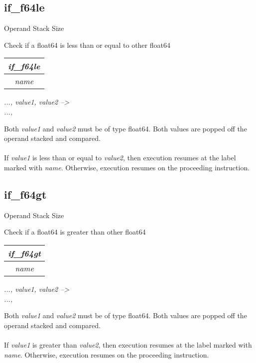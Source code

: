 \documentclass[12pt]{article}
\begin{document}
		\subsection*{if\_f64le}
			\begin{labeling}{Operand Stack Size}
				\item [\textbf{Operation}] Check if a float64 is less than or equal to other float64
				\item [\textbf{Format}] \begin{tabular}{| c |} \hline \textit{if\_f64le} \\ \hline \textit{name} \\ \hline \end{tabular}
				\item [\textbf{Operand Stack}] \textit{..., value1, value2 --\textgreater} \\
										\textit{..., }
				\item [\textbf{Description}] Both \textit{value1} and \textit{value2} must be of type float64. Both values are popped off the operand stacked and compared. \\ \\
				If \textit{value1} is less than or equal to \textit{value2}, then execution resumes at the label marked with \textit{name}. Otherwise, execution resumes on the proceeding instruction. 
			\end{labeling}	
		\newpage
		
		\subsection*{if\_f64gt}
			\begin{labeling}{Operand Stack Size}
				\item [\textbf{Operation}] Check if a float64 is greater than other float64
				\item [\textbf{Format}] \begin{tabular}{| c |} \hline \textit{if\_f64gt} \\ \hline \textit{name} \\ \hline \end{tabular}
				\item [\textbf{Operand Stack}] \textit{..., value1, value2 --\textgreater} \\
										\textit{..., }
				\item [\textbf{Description}] Both \textit{value1} and \textit{value2} must be of type float64. Both values are popped off the operand stacked and compared. \\ \\
				If \textit{value1} is greater than \textit{value2}, then execution resumes at the label marked with \textit{name}. Otherwise, execution resumes on the proceeding instruction. 
			\end{labeling}	
		\newpage
		
\end{document}
